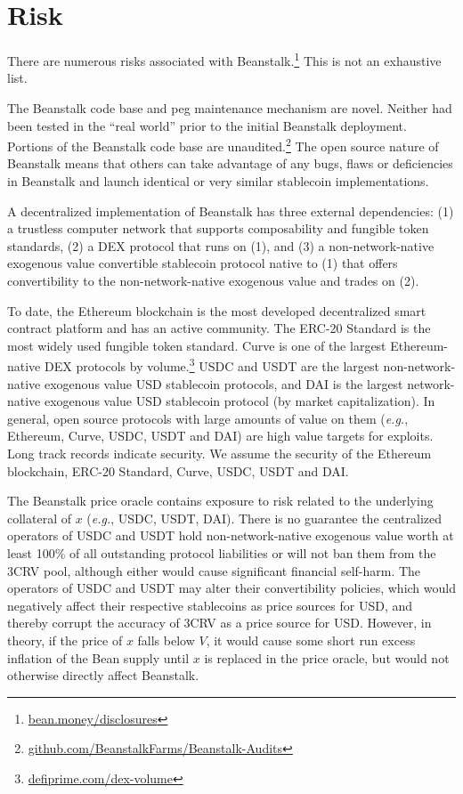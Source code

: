 \documentclass[tikz]{article}
\newcommand{\term}[1]{\textsl{#1}}
\newcommand{\fref}[1]{\footnote{\href{http://#1}{#1}}}
\begin{document}
\section{Risk}
There are numerous risks associated with Beanstalk.\fref{bean.money/disclosures} This is not an exhaustive list.

The Beanstalk code base and peg maintenance mechanism are novel. Neither had been tested in the “real world” prior to the initial Beanstalk deployment. Portions of the Beanstalk code base are unaudited.\footnote{\href{https://github.com/BeanstalkFarms/Beanstalk-Audits}{github.com/BeanstalkFarms/Beanstalk-Audits}} The open source nature of Beanstalk means that others can take advantage of any bugs, flaws or deficiencies in Beanstalk and launch identical or very similar stablecoin implementations.

A decentralized implementation of Beanstalk has three external dependencies: (1) a trustless computer network that supports composability and fungible token standards, (2) a DEX protocol that runs on (1), and (3) a non-network-native exogenous value convertible stablecoin protocol native to (1) that offers convertibility to the non-network-native exogenous value and trades on (2). 

To date, the Ethereum blockchain is the most developed decentralized smart contract platform and has an active community. The ERC-20 Standard is the most widely used fungible token standard. Curve is one of the largest Ethereum-native DEX protocols by volume.\fref{defiprime.com/dex-volume} USDC and USDT are the largest non-network-native exogenous value USD stablecoin protocols, and DAI is the largest network-native exogenous value USD stablecoin protocol (by market capitalization). In general, open source protocols with large amounts of value on them (\term{e.g.}, Ethereum, Curve, USDC, USDT and DAI) are high value targets for exploits. Long track records indicate security. We assume the security of the Ethereum blockchain, ERC-20 Standard, Curve, USDC, USDT and DAI.

\newpage
The Beanstalk price oracle contains exposure to risk related to the underlying collateral of \hyperlink{ht223}{$x$} (\term{e.g.}, USDC, USDT, DAI). There is no guarantee the centralized operators of USDC and USDT hold non-network-native exogenous value worth at least 100\% of all outstanding protocol liabilities or will not ban them from the 3CRV pool, although either would cause significant financial self-harm. The operators of USDC and USDT may alter their convertibility policies, which would negatively affect their respective stablecoins as price sources for USD, and thereby corrupt the accuracy of 3CRV as a price source for USD. However, in theory, if the price of \hyperlink{ht223}{$x$} falls below \hyperlink{ht216}{$V$}, it would cause some short run excess inflation of the Bean supply until \hyperlink{ht223}{$x$} is replaced in the price oracle, but would not otherwise directly affect Beanstalk.
\end{document}
